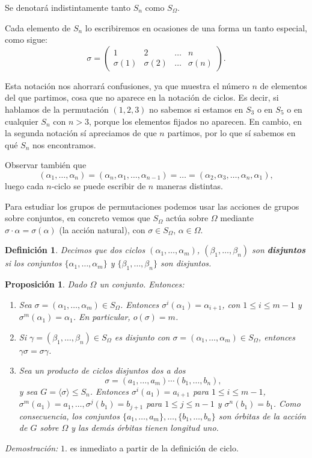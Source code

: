 \documentclass[12pt]{article}
\newtheorem{proposition}[theorem]{Proposición}
\newtheorem{definition}[theorem]{Definición}
\begin{document}
Se denotará indistintamente tanto $S_n$ como $S_\Omega$.

Cada elemento de $S_n$ lo escribiremos en ocasiones de una forma un tanto especial, como sigue: 
$$\sigma = \left(
\begin{matrix}
1 & 2 & \ldots & n \\
\sigma(1) & \sigma(2) & \ldots & \sigma(n)
\end{matrix}
\right).
$$

Esta notación nos ahorrará confusiones, ya que muestra el número $n$ de elementos del que partimos, cosa que no aparece en la notación de ciclos. Es decir, si hablamos de la permutación $(1,2,3)$ no sabemos si estamos en $S_3$ o en $S_5$ o en cualquier $S_n$ con $n>3$, porque los elementos fijados no aparecen. En cambio, en la segunda notación sí apreciamos de que $n$ partimos, por lo que sí sabemos en qué $S_n$ nos encontramos.

Observar también que $$(\alpha_1, \ldots, \alpha_n) = (\alpha_n, \alpha_1, \ldots, \alpha_{n-1}) = \ldots = (\alpha_2, \alpha_3, \ldots, \alpha_n, \alpha_1),$$ luego cada $n$-ciclo se puede escribir de $n$ maneras distintas.

Para estudiar los grupos de permutaciones podemos usar las acciones de grupos sobre conjuntos, en concreto vemos que $S_\Omega$ actúa sobre $\Omega$ mediante $\sigma \cdot \alpha = \sigma(\alpha)$ (la acción natural), con $\sigma \in S_\Omega$, $\alpha \in \Omega$.

\begin{definition}Decimos que dos ciclos $(\alpha_1, \ldots, \alpha_m)$, $(\beta_1, \ldots, \beta_n)$ son \textbf{disjuntos} si los conjuntos $\lbrace \alpha_1, \ldots, \alpha_m \rbrace$ y $\lbrace \beta_1, \ldots, \beta_n \rbrace$ son disjuntos.
\end{definition}

\begin{proposition}Dado $\Omega$ un conjunto. Entonces:
\begin{enumerate}
\item Sea $\sigma = (\alpha_1, \ldots, \alpha_m) \in S_\Omega$. Entonces $\sigma^i(\alpha_1) = \alpha_{i+1}$, con $1 \leq i \leq m-1$ y $\sigma^m(\alpha_1)=\alpha_1$. En particular, $o(\sigma) = m$.
\item Si $\gamma = (\beta_1, \ldots, \beta_n) \in S_\Omega$ es disjunto con $\sigma = (\alpha_1, \ldots, \alpha_m) \in S_\Omega$, entonces $\gamma \sigma = \sigma \gamma$.
\item Sea un producto de ciclos disjuntos dos a dos $$\sigma= (a_{1}, \ldots, a_{m}) \cdots (b_{1}, \ldots, b_{n}),$$ y sea $G =\langle \sigma \rangle \leq S_{n}$. Entonces $\sigma^{i}(a_{1}) = a_{i+1}$ para $1 \leq i \leq m-1$, $\sigma^{m}(a_{1})=a_{1}, \ldots, \sigma^{j}(b_{1})=b_{j+1}$ para $1 \leq j \leq n-1$ y $\sigma^{n}(b_{1})=b_{1}$. Como consecuencia, los conjuntos $\lbrace a_{1}, \ldots, a_{m} \rbrace, \ldots, \lbrace b_{1}, \ldots, b_{n}\rbrace$ son órbitas de la acción de $G$ sobre $\Omega$ y las demás órbitas tienen longitud uno.
\end{enumerate}
\end{proposition}
\emph{Demostración: }$1.$ es inmediato a partir de la definición de ciclo. 
\end{document}
